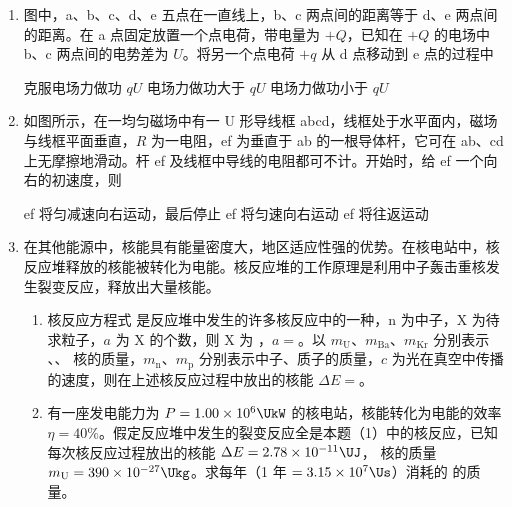 \documentclass[\gkver]{gaokaozhenti}
\begin{document}
\begin{enumerate}
\item
图中，a、b、c、d、e 五点在一直线上，b、c 两点间的距离等于 d、e 两点间的距离。在 a 点固定放置一个点电荷，带电量为 $+Q$，已知在 $+Q$ 的电场中 b、c 两点间的电势差为 $U$。将另一个点电荷 $+q$ 从 d 点移动到 e 点的过程中


{克服电场力做功 $qU$}
{电场力做功大于 $qU$}
{电场力做功小于 $qU$}


\item
如图所示，在一均匀磁场中有一 U 形导线框 abcd，线框处于水平面内，磁场与线框平面垂直，$R$ 为一电阻，ef 为垂直于 ab 的一根导体杆，它可在 ab、cd 上无摩擦地滑动。杆 ef 及线框中导线的电阻都可不计。开始时，给 ef 一个向右的初速度，则


{ef 将匀减速向右运动，最后停止}
{ef 将匀速向右运动}
{ef 将往返运动}


\item
在其他能源中，核能具有能量密度大，地区适应性强的优势。在核电站中，核反应堆释放的核能被转化为电能。核反应堆的工作原理是利用中子轰击重核发生裂变反应，释放出大量核能。

\begin{enumerate}
	\item
	核反应方程式  是反应堆中发生的许多核反应中的一种，n 为中子，X 为待求粒子，$a$ 为 X 的个数，则 X 为 ，$a=$。以 $m_{\mathrm{U}}$、$m_{\mathrm{Ba}}$、$m_{\mathrm{Kr}}$ 分别表示 、、 核的质量，$m_{\mathrm{n}}$、$m_{\mathrm{p}}$ 分别表示中子、质子的质量，$c$ 为光在真空中传播的速度，则在上述核反应过程中放出的核能 $\Delta E=$。
	\item
	有一座发电能力为 $P=1.00\times10^{6}\UkW$ 的核电站，核能转化为电能的效率 $\eta=40\%$。假定反应堆中发生的裂变反应全是本题（1）中的核反应，已知每次核反应过程放出的核能 $\Delta E=2.78\times10^{-11}\UJ$， 核的质量 $m_{\mathrm{U}}=390\times10^{-27}\Ukg$。求每年（1 年 $=3.15\times10^{7}\Us$）消耗的  的质量。
\end{enumerate}


\end{enumerate}
\end{document}
